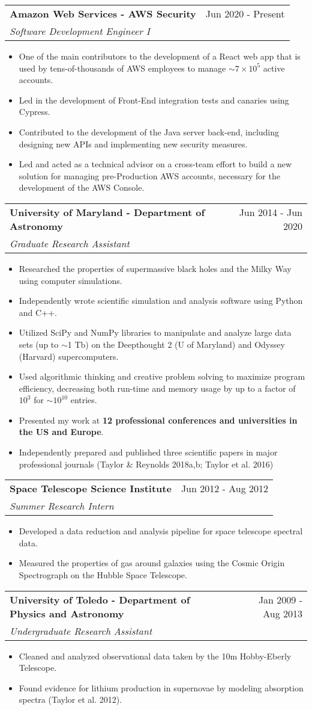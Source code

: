 \documentclass[letterpaper,11pt]{article}
\makeatletter
\newlength{\outerbordwidth}
\newcommand{\resitem}[1]{\item #1 \vspace{-4pt}}
\newcommand{\resheading}[1]{\vspace{1pt}
  \parbox{\textwidth}{\setlength{\FrameSep}{\outerbordwidth}
    \begin{shaded}
\setlength{\fboxsep}{0pt}\framebox[\textwidth][l]{\setlength{\fboxsep}{4pt}\fcolorbox{shadecolorB}{shadecolorB}{\textbf{\sffamily{\mbox{~}\makebox[7.25in][l]{\large #1} \vphantom{p\^{E}}}}}}
    \end{shaded}
  }\vspace{-5pt}
}
\newcommand{\ressubheading}[4]{
\begin{tabular*}{7.5in}{l@{\cftdotfill{\cftsecdotsep}\extracolsep{\fill}}r}
		\textbf{#1} & #2 \\
		\textit{#3} & \textit{#4} \\
\end{tabular*}\vspace{-6pt}}
\makeatother
\begin{document}
\resheading{Work Experience}
\ressubheading{Amazon Web Services - AWS Security}{Jun 2020 - Present}{Software Development Engineer I}{}
\begin{itemize}
	\resitem{One of the main contributors to the development of a React web app that is used by tens-of-thousands of AWS employees to manage $\sim 7 \times 10^{5}$ active accounts.}
	\resitem{Led in the development of Front-End integration tests and canaries using Cypress.}
	\resitem{Contributed to the development of the Java server back-end, including designing new APIs and implementing new security measures.}
	\resitem{Led and acted as a technical advisor on a cross-team effort to build a new solution for managing pre-Production AWS accounts, necessary for the development of the AWS Console.}
\end{itemize}
\ressubheading{University of Maryland - Department of Astronomy}{Jun 2014 - Jun 2020}{Graduate Research Assistant}{}
\begin{itemize}
	\resitem{Researched the properties of supermassive black holes and the Milky Way using computer simulations.}
	\resitem{Independently wrote scientific simulation and analysis software using Python and C++.}
	\resitem{Utilized SciPy and NumPy libraries to manipulate and analyze large data sets (up to $\sim$1 Tb) on the Deepthought 2 (U of Maryland) and Odyssey (Harvard) supercomputers.}
	\resitem{Used algorithmic thinking and creative problem solving to maximize program efficiency, decreasing both run-time and memory usage by up to a factor of  $10^{3}$ for $\sim10^{10}$ entries.}
	\resitem{Presented my work at \textbf{12 professional conferences and universities in the US and Europe}.}
	\resitem{Independently prepared and published three scientific papers in major professional journals (Taylor \& Reynolds 2018a,b; Taylor et al. 2016)}
\end{itemize}
\ressubheading{Space Telescope Science Institute}{Jun 2012 - Aug 2012}{Summer Research Intern}{}
\begin{itemize}
	\resitem{Developed a data reduction and analysis pipeline for space telescope spectral data.}
	\resitem{Measured the properties of gas around galaxies using the Cosmic Origin Spectrograph on the Hubble Space Telescope.}
\end{itemize}
\ressubheading{University of Toledo - Department of Physics and Astronomy}{Jan 2009 - Aug 2013}{Undergraduate Research Assistant}{}
\begin{itemize}
	\resitem{Cleaned and analyzed observational data taken by the 10m Hobby-Eberly Telescope.}
	\resitem{Found evidence for lithium production in supernovae by modeling absorption spectra (Taylor et al. 2012).}
\end{itemize}
\end{document}
